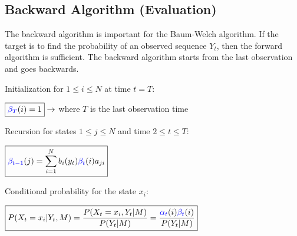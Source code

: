 \begin{minipage}[t]{0.49\textwidth}
\subsection{Backward Algorithm (Evaluation)}
The backward algorithm is important for the Baum-Welch algorithm. If the target is to find the probability of an observed sequence $Y_t$, then 
the forward algorithm is sufficient. The backward algorithm starts from the last observation and goes backwards.

\begin{aufzaehlung}
	\item Initialization for $1 \leq i \leq N$ at time $t=T$:\\
	
	\vspace{-0.3cm}
	
	$\boxed{\textcolor{blue}{\beta_T}(i)=1}\to$ where $T$ is the last observation time
	\item Recursion for states $1 \leq j \leq N$ and time $2\leq t\leq T$:\\
	
	\vspace{-0.3cm}
	
	 $\boxed{\textcolor{blue}{\beta_{t-1}}(j)=\sum\limits_{i=1}^{N}{b_i(y_t)\textcolor{blue}{\beta_t}(i)a_{ji}}}$
	 \item Conditional probability for the state $x_i$:\\
	 	
	 \vspace{-0.3cm}
	 	
	 $\boxed{P(X_t=x_i|Y_t,M)=\frac{P(X_t=x_i,Y_t|M)}{P(Y_t|M)}=\frac{\textcolor{blue}{\alpha_t}(i)\textcolor{blue}{\beta_t}(i)}{P(Y_t|M)}}$
	 
\end{aufzaehlung}
\end{minipage}

\vspace{1cm}

